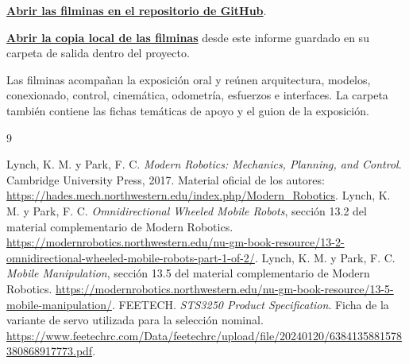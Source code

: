 \medskip
\noindent\href{https://github.com/kobachajchir/ProyectoRobotica2/blob/codex/monorepo-cad/presentacion/AutoFinalRobo2_Presentacion.pptx}{\textbf{Abrir las filminas en el repositorio de GitHub}}.

\medskip
\noindent\href{run:../../../../presentacion/AutoFinalRobo2_Presentacion.pptx}{\textbf{Abrir la copia local de las filminas}} desde este informe guardado en su carpeta de salida dentro del proyecto.

\medskip
Las filminas acompañan la exposición oral y reúnen arquitectura, modelos, conexionado, control, cinemática, odometría, esfuerzos e interfaces. La carpeta también contiene las fichas temáticas de apoyo y el guion de la exposición.

\clearpage
\begin{thebibliography}{9}
 Lynch, K. M. y Park, F. C. \emph{Modern Robotics: Mechanics, Planning, and Control}. Cambridge University Press, 2017. Material oficial de los autores: \url{https://hades.mech.northwestern.edu/index.php/Modern_Robotics}.
 Lynch, K. M. y Park, F. C. \emph{Omnidirectional Wheeled Mobile Robots}, sección 13.2 del material complementario de Modern Robotics. \url{https://modernrobotics.northwestern.edu/nu-gm-book-resource/13-2-omnidirectional-wheeled-mobile-robots-part-1-of-2/}.
 Lynch, K. M. y Park, F. C. \emph{Mobile Manipulation}, sección 13.5 del material complementario de Modern Robotics. \url{https://modernrobotics.northwestern.edu/nu-gm-book-resource/13-5-mobile-manipulation/}.
 FEETECH. \emph{STS3250 Product Specification}. Ficha de la variante de servo utilizada para la selección nominal. \url{https://www.feetechrc.com/Data/feetechrc/upload/file/20240120/6384135881578380868917773.pdf}.
\end{thebibliography}
\endinput

